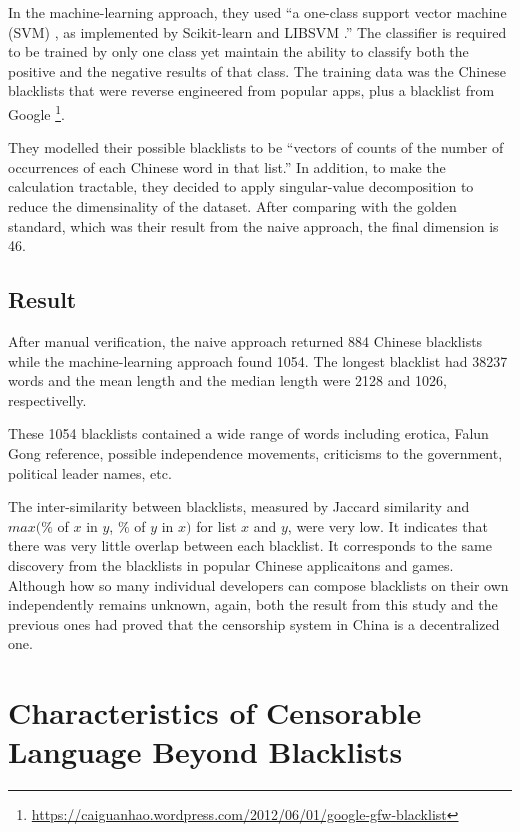 \documentclass[11pt]{article} %
\begin{document}
In the machine-learning approach, they used ``a one-class support vector machine (SVM) \cite{scholkopf2001estimating}, as implemented by Scikit-learn \cite{pedregosa2011scikit} and LIBSVM \cite{chang2011libsvm}.'' The classifier is required to be trained by only one class yet maintain the ability to classify both the positive and the negative results of that class. The training data was the Chinese blacklists that were reverse engineered from popular apps, plus a blacklist from Google \footnote{\url{https://caiguanhao.wordpress.com/2012/06/01/google-gfw-blacklist}}.

They modelled their possible blacklists to be ``vectors of counts of the number of occurrences of each Chinese word in that list.''\cite{knockel2018effect} In addition, to make the calculation tractable, they decided to apply singular-value decomposition to reduce the dimensinality of the dataset. After comparing with the golden standard, which was their result from the naive approach, the final dimension is 46.

\subsection{Result}

After manual verification, the naive approach returned 884 Chinese blacklists while the machine-learning approach found 1054. The longest blacklist had 38237 words and the mean length and the median length were 2128 and 1026, respectivelly.

These 1054 blacklists contained a wide range of words including erotica, Falun Gong reference, possible independence movements, criticisms to the 
government, political leader names, etc.

The inter-similarity between blacklists, measured by Jaccard similarity and $max(\% $ of $x$ in $y$, $\%$ of $y$ in $x)$ for list $x$ and $y$, were very low. It indicates that there was very little overlap between each blacklist. It corresponds to the same discovery from the blacklists in popular Chinese applicaitons and games. Although how so many individual developers can compose blacklists on their own independently remains unknown, again, both the result from this study and the previous ones had proved that the censorship system in China is a decentralized one.

\section{Characteristics of Censorable Language Beyond Blacklists}
\end{document}
